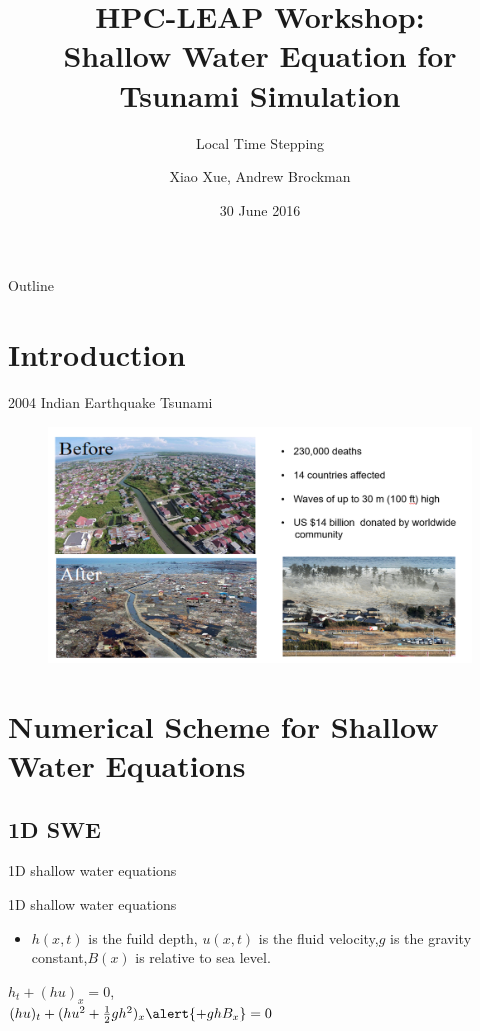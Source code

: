 \documentclass{beamer}
\title[Local Time Stepping]{HPC-LEAP Workshop:\\ Shallow Water Equation for Tsunami Simulation}
\subtitle{Local Time Stepping}
\author[Xiao Xue, Andrew Brockman]{Xiao Xue, Andrew Brockman}  %
\institute[]{HPC-LEAP Marie Curie Action}
\date{30 June 2016}
\begin{document}
\begin{frame}
  \titlepage
\end{frame}

\begin{frame}{Outline}
  \tableofcontents
\end{frame}

\section{Introduction}
\begin{frame}[t]{2004 Indian Earthquake Tsunami}
  \begin{figure}[p]
    \centering
    \includegraphics[width=\textwidth]{tsunami}
    \label{fig:awesome_image}
\end{figure}
\end{frame}

\section{Numerical Scheme for Shallow Water Equations}
\subsection{1D SWE}
\begin{frame}{1D shallow water equations}

    \begin{block}{1D shallow water equations}
      \begin{itemize}
        \item $h(x,t)$ is the fuild depth, $u(x,t)$ is the fluid velocity,$g$ is the gravity constant,$B(x)$ is relative to sea level.
        
      \end{itemize}
      \begin{center}
      	$h_{t} + (hu)_{x} = 0$,\\
	    $(hu)_{t} + (hu^{2} + \frac{1}{2}gh^{2})_{x} \alert{+ ghB_{x}} =0$
	  \end{center}
    \end{block}
  
 
\end{frame}
\end{document}
